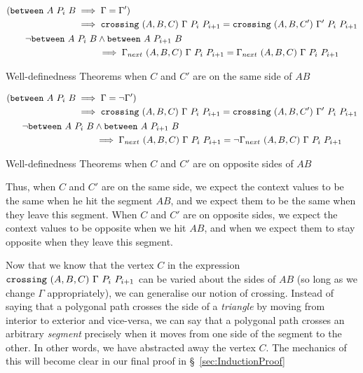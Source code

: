 \begin{boxedfigure}
  \begin{gather}
    \begin{split}
      (\texttt{between}\ A\ P_i\ B&\implies \Gamma = \Gamma')\\
      &\implies\texttt{crossing}\ (A,B,C)\ \Gamma\ P_i\ P_{i+1} = \texttt{crossing}\ (A,B,C')\ \Gamma'\ P_i\ P_{i+1}
    \end{split}\\
    \begin{split}
      \neg\texttt{between}\ A\ P_i\ B&\wedge\texttt{between}\ A\ P_{i+1}\ B\\
      &\implies \Gamma_{next}\ (A,B,C)\ \Gamma\ P_i\ P_{i+1} = \Gamma_{next}\ (A,B,C)\ \Gamma\ P_i\ P_{i+1}
    \end{split}
  \end{gather}
  \caption{Well-definedness Theorems when $C$ and $C'$ are on the same side of $AB$}
  \label{fig:CrossChange1}
\end{boxedfigure}

\begin{boxedfigure}
  \begin{gather}
    \begin{split}
      (\texttt{between}\ A\ P_i\ B&\implies \Gamma = \neg\Gamma')\\
      &\implies\texttt{crossing}\ (A,B,C)\ \Gamma\ P_i\ P_{i+1} = \texttt{crossing}\ (A,B,C')\ \Gamma'\ P_i\ P_{i+1}
    \end{split}\\
    \begin{split}
      \neg\texttt{between}\ A\ P_i\ B&\wedge\texttt{between}\ A\ P_{i+1}\ B\\
      &\implies \Gamma_{next}\ (A,B,C)\ \Gamma\ P_i\ P_{i+1} = \neg\Gamma_{next}\ (A,B,C)\ \Gamma\ P_i\ P_{i+1}
    \end{split}
  \end{gather}
  \caption{Well-definedness Theorems when $C$ and $C'$ are on opposite sides of $AB$}
  \label{fig:CrossChange2}
\end{boxedfigure}

Thus, when $C$ and $C'$ are on the same side, we expect the context values to be the same when he hit the segment $AB$, and we expect them to be the same when they leave this segment. When $C$ and $C'$ are on opposite sides, we expect the context values to be opposite when we hit $AB$, and when we expect them to stay opposite when they leave this segment. 

Now that we know that the vertex $C$ in the expression $\code{crossing}\ (A,B,C)\ \Gamma\ P_i\ P_{i+1}$ can be varied about the sides of $AB$ (so long as we change $\Gamma$ appropriately), we can generalise our notion of crossing. Instead of saying that a polygonal path crosses the side of a  \emph{triangle} by moving from interior to exterior and vice-versa, we can say that a polygonal path crosses an arbitrary \emph{segment} precisely when it moves from one side of the segment to the other. In other words, we have abstracted away the vertex $C$. The mechanics of this will become clear in our final proof in \S~\ref{sec:InductionProof}

